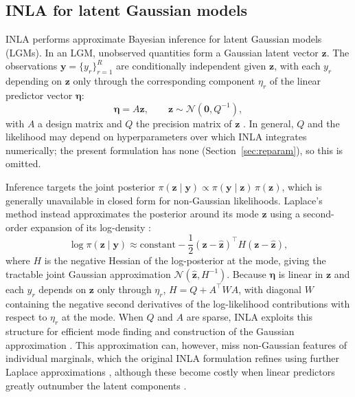 \documentclass{statsmsc}
\begin{document}
\subsection{INLA for latent Gaussian models} \label{sec:inla}

INLA \citep{rue2009approximate} performs approximate Bayesian inference for latent Gaussian models (LGMs). In an LGM, unobserved quantities form a Gaussian latent vector $\boldsymbol{z}$. The observations $\boldsymbol{y} = \{y_r\}_{r=1}^R$ are conditionally independent given $\boldsymbol{z}$, with each $y_r$ depending on $\boldsymbol{z}$ only through the corresponding component $\eta_r$ of the linear predictor vector $\boldsymbol{\eta}$:
\begin{equation*} 
 \boldsymbol{\eta} = A\boldsymbol{z}, \qquad \boldsymbol{z} \sim \mathcal{N}(\boldsymbol{0},Q^{-1}),
\end{equation*}
with $A$ a design matrix and $Q$ the precision matrix of $\boldsymbol{z}$ \citep{vanniekerk2023new}. In general, $Q$ and the likelihood may depend on hyperparameters over which INLA integrates numerically; the present formulation has none (Section~\ref{sec:reparam}), so this is omitted.

Inference targets the joint posterior $\pi(\boldsymbol{z} \mid \boldsymbol{y})\propto
\pi(\boldsymbol{y}\mid \boldsymbol{z})\,\pi(\boldsymbol{z})$, which is generally unavailable in closed form for non-Gaussian likelihoods. Laplace's method instead approximates the posterior around its mode $\widehat{\boldsymbol{z}}$ using a second-order expansion of its log-density \citep{tierney1986accurate}:
\begin{equation*}
\log \pi(\boldsymbol{z}\mid\boldsymbol{y})
\approx
\mathrm{constant}
-\frac{1}{2}
(\boldsymbol{z}-\widehat{\boldsymbol{z}})^\top
H
(\boldsymbol{z}-\widehat{\boldsymbol{z}}),
\end{equation*}
where $H$ is the negative Hessian of the log-posterior at the mode, giving the tractable joint Gaussian approximation
$\mathcal{N}(\widehat{\boldsymbol{z}},H^{-1})$. Because $\boldsymbol{\eta}$ is linear in $\boldsymbol{z}$ and each $y_r$ depends on $\boldsymbol{z}$ only through $\eta_r$, $H = Q+A^\top WA$, with diagonal $W$ containing the negative second derivatives of the log-likelihood contributions with respect to $\eta_r$ at the mode. When $Q$ and $A$ are sparse, INLA exploits this structure for efficient mode finding and construction of the Gaussian approximation \citep{rue2009approximate}. This approximation can, however, miss non-Gaussian features of individual marginals, which the original INLA formulation refines using further Laplace approximations \citep{rue2009approximate}, although these become costly when linear predictors greatly outnumber the latent components \citep{vanniekerk2023new}.
\end{document}
